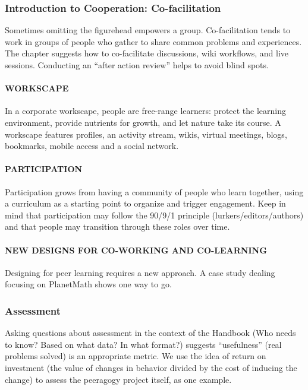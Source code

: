 \subsubsection{Introduction to Cooperation: Co-facilitation}

Sometimes omitting the figurehead empowers a group. Co-facilitation
tends to work in groups of people who gather to share common problems
and experiences. The chapter suggests how to co-facilitate discussions,
wiki workflows, and live sessions. Conducting an ``after action review''
helps to avoid blind spots.

\paragraph{WORKSCAPE} In a corporate workscape, people are free-range
learners: protect the learning environment, provide nutrients for
growth, and let nature take its course. A workscape features profiles,
an activity stream, wikis, virtual meetings, blogs, bookmarks, mobile
access and a social network.

 \paragraph{PARTICIPATION} Participation grows from having a
community of people who learn together, using a curriculum as a starting
point to organize and trigger engagement. Keep in mind that
participation may follow the 90/9/1 principle (lurkers/editors/authors)
and that people may transition through these roles over time.

 \paragraph{NEW DESIGNS FOR CO-WORKING AND CO-LEARNING} Designing for
peer learning requires a new approach.  A case study dealing focusing
on PlanetMath shows one way to go.

\subsubsection{Assessment}

Asking questions about assessment in the context of the Handbook (Who
needs to know? Based on what data? In what format?) suggests
``usefulness'' (real problems solved) is an appropriate metric. We use
the idea of return on investment (the value of changes in behavior
divided by the cost of inducing the change) to assess the peeragogy
project itself, as one example.

